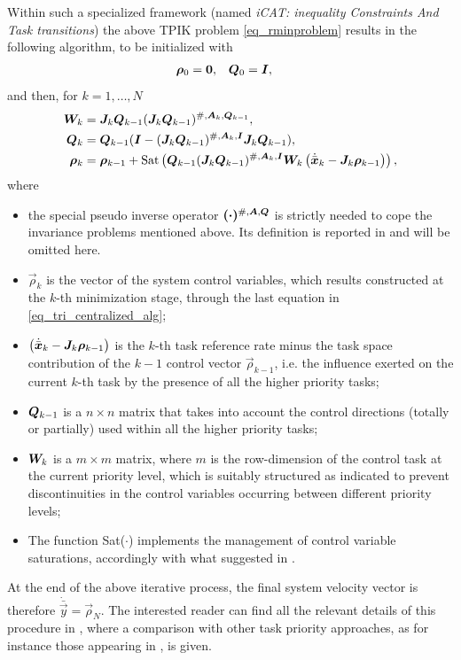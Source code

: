 Within such a specialized framework (named \emph{iCAT: inequality Constraints And Task transitions}) the above TPIK problem \eqref{eq_rminproblem} results in the following algorithm, to be initialized with
\begin{equation}\label{eq_init}
\begin{aligned}
\bm{\rho}_{0} &= \bm{0}, & \bm{Q}_{0} &= \bm{I},
\end{aligned}
\end{equation}
and then, for $k = 1, \ldots, N$
\begin{equation}\label{eq_tri_centralized_alg}
\begin{aligned}
\bm{W}_k &=  \bm{J}_k \bm{Q}_{k-1} (\bm{J}_k \bm{Q}_{k-1})^{\#,\bm{A}_k,\bm{Q}_{k-1}}, \\
\bm{Q}_k &= \bm{Q}_{k-1} (\bm{I} - (\bm{J}_k \bm{Q}_{k-1})^{\#,\bm{A}_k,\bm{I}} {\bm{J}_k \bm{Q}_{k-1}}),\\
\bm{\rho}_k &= \bm{\rho}_{k-1} + \textrm{Sat}\left( \bm{Q}_{k-1} (\bm{J}_k \bm{Q}_{k-1})^{\#,\bm{A}_k,\bm{I}} \bm{W}_k \left(\dot{\bar{\bm{x}}}_k - \bm{J}_k \bm{\rho}_{k-1} \right) \right),
\end{aligned}
\end{equation}
where 
\begin{itemize}
	\item the special pseudo inverse operator $\bm{(\cdot)}^{\#,\bm{A},\bm{Q}}$ is strictly needed to cope the invariance problems mentioned above. Its definition is reported in \cite{Simetti2016d} and will be omitted here.
	\item $\vec{\rho}_k$ is the vector of the system control variables, which results constructed at the $k$-th minimization stage, through the last equation in \eqref{eq_tri_centralized_alg};
	\item $\left(\dot{\bar{\bm{x}}}_k - \bm{J}_k \bm{\rho}_{k-1} \right)$ is the $k$-th task reference rate minus the task space contribution of the $k-1$ control vector $\vec{\rho}_{k-1}$, i.e. the influence exerted on the current $k$-th task by the presence of all the higher priority tasks;
	\item $\bm{Q}_{k-1}$ is a $n \times n$ matrix that takes into account the control directions (totally or partially) used within all the higher priority tasks;
	\item $\bm{W}_k$ is a $m \times m$ matrix, where $m$ is the row-dimension of the control task at the current priority level, which is suitably structured as indicated to prevent discontinuities in the control variables occurring between different priority levels;
	\item The function Sat($\cdot$) implements the management of control variable saturations, accordingly with what suggested in \cite{Antonelli2009b}.
\end{itemize}
At the end of the above iterative process, the final system velocity vector is therefore $\dot{\bar{\vec{y}}} = \vec{\rho}_N.$ The interested reader can find all the relevant details of this procedure in \cite{Simetti2016d}, where a comparison with other task priority approaches, as for instance those appearing in \cite{Kanoun2011, Escande2014, Moe2016}, is given.